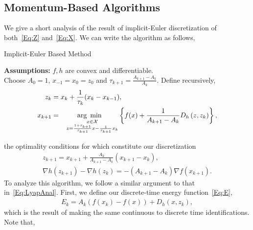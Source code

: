 \documentclass[11pt]{article}
\theoremstyle{plain}
\newcommand{\X}{{\mathcal X}}
\begin{document}
   \subsection{Momentum-Based Algorithms}
 We give a short analysis of the result of implicit-Euler discretization of both~\eqref{Eq:Z} and~\eqref{Eq:X}. We can write the algorithm as follows,
\begin{algorithm}[H]
\caption{Implicit-Euler Based Method}
{\bf Assumptions:} $f, h$ are convex and differentiable.\\
Choose $A_0 = 1$, $x_{-1}= x_0 = z_0$ and $\tau_{k+1} = \frac{A_{k+1} - A_k}{A_k}$. Define recursively,
\begin{subequations}\label{Eq:AlgoForward1}
\begin{align}
z_{k} &= x_{k} + \frac{1}{\tau_{k}} (x_{k} - x_{k-1}),\\%
x_{k+1} &= \underset{\substack{\,\,\,\,\,\,x\in\X\\ \,\,\,\,\,\,z =  \frac{1 + \tau_{k+1}}{\tau_{k+1}} x - \frac{1}{\tau_{k+1}} x_k}}{\text{arg\,\,\,min}} \left\{ f(x) + \frac{1}{A_{k+1} - A_k}D_h\left(z, z_k\right)\right\},
\end{align}
\end{subequations}
\end{algorithm}
\noindent the optimality conditions for which constitute our discretization
\begin{subequations}
\begin{align}
z_{k+1} = x_{k+1} + \frac{A_k}{A_{k+1} -A_{k}} (x_{k+1} - x_k),\label{Eq:ZSeq}\\
\nabla h(z_{k+1}) - \nabla h(z_k) = -(A_{k+1} - A_{k})\nabla f(x_{k+1})\label{Eq:XSeq}.
\end{align}
\end{subequations}
\noindent To analyze this algorithm, we follow a similar argument to that in~\eqref{Eq:LyapAnal}. %
First, we define our discrete-time energy function~\eqref{Eq:E},
\begin{align}\label{Eq:DiscLyapFunc1}
 E_k = A_k(f(x_k) - f(x)) + D_h(x, z_{k}),
 \end{align}
which is the result of making the same continuous to discrete time identifications. Note that,
\end{document}
